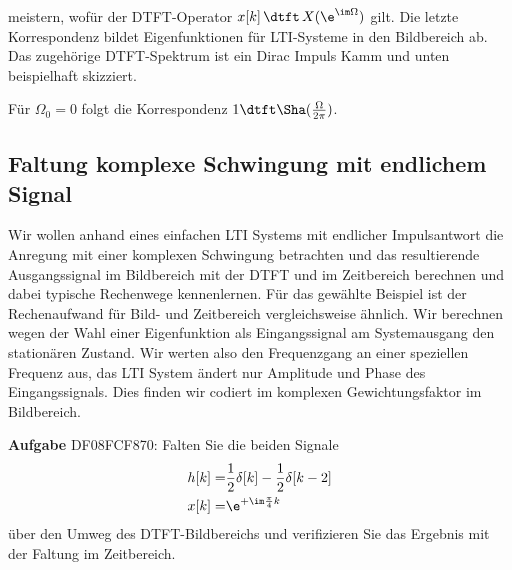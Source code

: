 meistern, wofür der DTFT-Operator $x[k] \,\dtft\, X(\e^{\im\Omega})$ gilt.
%
Die letzte Korrespondenz bildet Eigenfunktionen für LTI-Systeme in den Bildbereich ab.
Das zugehörige DTFT-Spektrum ist ein Dirac Impuls Kamm und unten beispielhaft skizziert.
%
\begin{center}
\end{center}
Für $\Omega_0=0$ folgt die Korrespondenz $1 \dtft \Sha(\frac{\Omega}{2\pi})$.

\newpage
\subsection{Faltung komplexe Schwingung mit endlichem Signal}
\label{sec:DF08FCF870}
\begin{Ziel}
Wir wollen anhand eines einfachen LTI Systems mit endlicher Impulsantwort
die Anregung mit einer komplexen Schwingung betrachten und das resultierende
Ausgangssignal im Bildbereich mit der DTFT und im Zeitbereich berechnen und
dabei typische Rechenwege kennenlernen. Für das gewählte
Beispiel ist der Rechenaufwand für Bild- und Zeitbereich
vergleichsweise ähnlich.
%
Wir berechnen wegen der Wahl einer Eigenfunktion als Eingangssignal
am Systemausgang den stationären Zustand. Wir werten also den Frequenzgang
an einer speziellen Frequenz aus, das LTI System ändert nur Amplitude und Phase
des Eingangssignals. Dies finden wir codiert im komplexen Gewichtungsfaktor
im Bildbereich.
\end{Ziel}
\textbf{Aufgabe} {\tiny DF08FCF870}: Falten Sie die beiden Signale
\begin{align}
h[k] =& \frac{1}{2}\delta[k] - \frac{1}{2}\delta[k-2]\\
x[k] =& \e^{+\im \frac{\pi}{4} k}
\end{align}
über den Umweg des DTFT-Bildbereichs und verifizieren Sie das Ergebnis
mit der Faltung im Zeitbereich.

